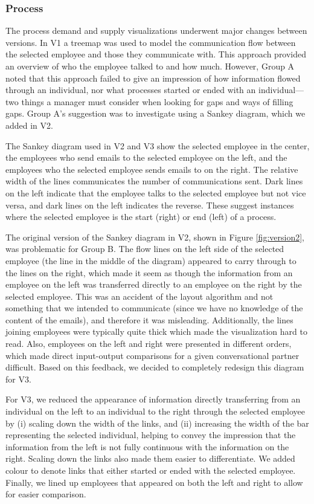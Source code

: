 \documentclass[journal]{vgtc}                %
\begin{document}
\subsubsection{Process}

The process demand and supply visualizations underwent major changes between versions.  In V1 a treemap was used to model the communication flow between the selected employee and those they communicate with.  This approach provided an overview of who the employee talked to and how much. However, Group A noted that this approach failed to give an impression of how information flowed through an individual, nor what processes started or ended with an individual---two things a manager must consider when looking for gaps and ways of filling gaps.  Group A's suggestion was to investigate using a Sankey diagram, which we added in V2.

The Sankey diagram used in V2 and V3 show the selected employee in the center, the employees who send emails to the selected employee on the left, and the employees who the selected employee sends emails to on the right. The relative width of the lines communicates the number of communications sent. Dark lines on the left indicate that the employee talks to the selected employee but not vice versa, and dark lines on the left indicates the reverse. These suggest instances where the selected employee is the start (right) or end (left) of a process. 

The original version of the Sankey diagram in V2, shown in Figure \ref{fig:version2}, was problematic for Group B. The flow lines on the left side of the selected employee (the line in the middle of the diagram) appeared to carry through to the lines on the right, which made it seem as though the information from an employee on the left was transferred directly to an employee on the right by the selected employee. This was an accident of the layout algorithm and not something that we intended to communicate (since we have no knowledge of the content of the emails), and therefore it was misleading.  Additionally, the lines joining employees were typically quite thick which made the visualization hard to read. Also, employees on the left and right were presented in different orders, which made direct input-output comparisons for a given conversational partner difficult. Based on this feedback, we decided to completely redesign this diagram for V3.

For V3, we reduced the appearance of information directly transferring from an individual on the left to an individual to the right through the selected employee by (i) scaling down the width of the links, and (ii) increasing the width of the bar representing the selected individual, helping to convey the impression that the information from the left is not fully continuous with the information on the right.  Scaling down the links also made them easier to differentiate. We added colour to denote links that either started or ended with the selected employee. Finally, we lined up employees that appeared on both the left and right to allow for easier comparison.
\end{document}
